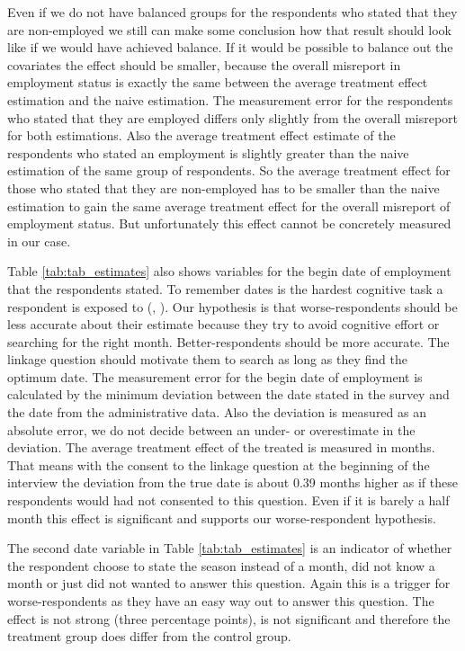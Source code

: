 Even if we do not have balanced groups for the respondents who stated that they are non-employed we still can make some conclusion how that result should look like if we would have achieved balance. If it would be possible to balance out the covariates the effect should be smaller, because the overall misreport in employment status is exactly the same between the average treatment effect estimation and the naive estimation. The measurement error for the respondents who stated that they are employed differs only slightly from the overall misreport for both estimations. Also the average treatment effect estimate of the respondents who stated an employment is slightly greater than the naive estimation of the same group of respondents. So the average treatment effect for those who stated that they are non-employed has to be smaller than the naive estimation to gain the same average treatment effect for the overall misreport of employment status. But unfortunately this effect cannot be concretely measured in our case.

Table \ref{tab:tab_estimates} also shows variables for the begin date of employment that the respondents stated. To remember dates is the hardest cognitive task a respondent is exposed to (\cite{Wagenaar86}, \cite{Friedman93}). Our hypothesis is that worse-respondents should be less accurate about their estimate because they try to avoid cognitive effort or searching for the right month. Better-respondents should be more accurate. The linkage question should motivate them to search as long as they find the optimum date. The measurement error for the begin date of employment is calculated by the minimum deviation between the date stated in the survey and the date from the administrative data. Also the deviation is measured as an absolute error, we do not decide between an under- or overestimate in the deviation. The average treatment effect of the treated is measured in months. That means with the consent to the linkage question at the beginning of the interview the deviation from the true date is about 0.39 months higher as if these respondents would had not consented to this question. Even if it is barely a half month this effect is significant and supports our worse-respondent hypothesis.

The second date variable in Table \ref{tab:tab_estimates} is an indicator of whether the respondent choose to state the season instead of a month, did not know a month or just did not wanted to answer this question. Again this is a trigger for worse-respondents as they have an easy way out to answer this question. The effect is not strong (three percentage points), is not significant and therefore the treatment group does differ from the control group.

